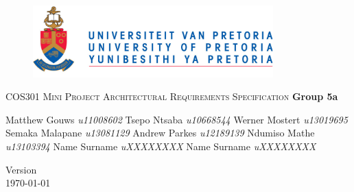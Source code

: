 \begin{titlepage}
\begin{center}
	\begin{figure}[t]
		\centering
		\includegraphics[width=350px]{UP_Logo.png}
	\end{figure}
	
\textsc{\LARGE COS301 Mini Project \newline\newline Architectural Requirements Specification}
		\textbf{\newline Group 5a} \\
		\begin{flushright} \large
			Matthew Gouws \emph{u11008602} \newline
			Tsepo Ntsaba \emph{u10668544} \newline
			Werner Mostert \emph{u13019695} \newline
			Semaka Malapane \emph{u13081129} \newline
			Andrew Parkes \emph{u12189139} \newline
			Ndumiso Mathe \emph{u13103394} \newline
			Name Surname \emph{uXXXXXXXX} \newline
			Name Surname \emph{uXXXXXXXX} \newline
		\end{flushright}
		
		\vfill
		
		{\large Version }
		\\
		{\large \today}
		
\end{center}
\end{titlepage}
